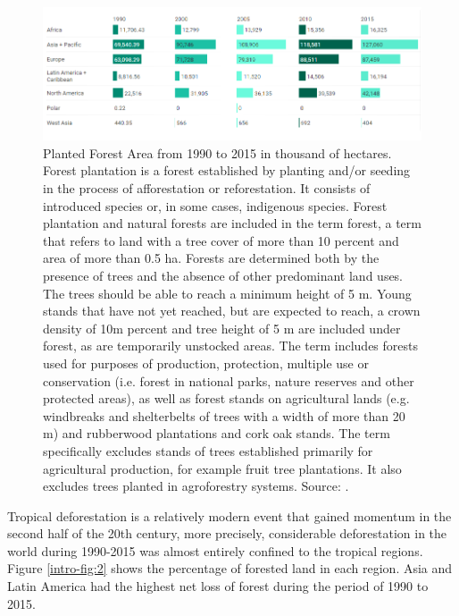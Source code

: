 \begin{figure}[H]
\centering
\includegraphics[width=1\linewidth]{Introduction/forestplantation.png}
\caption[Planted Forest Area from 1990 to 2015 in thousand of hectares]{Planted Forest Area from 1990 to 2015 in thousand of hectares. Forest plantation is a forest established by planting and/or seeding in the process of afforestation or reforestation. It consists of introduced species or, in some cases, indigenous species. Forest plantation and natural forests are included in the term forest, a term that refers to land with a tree cover of more than 10 percent and area of more than 0.5 ha. Forests are determined both by the presence of trees and the absence of other predominant land uses. The trees should be able to reach a minimum height of 5 m. Young stands that have not yet reached, but are expected to reach, a crown density of 10m percent and tree height of 5 m are included under forest, as are temporarily unstocked areas. The term includes forests used for purposes of production, protection, multiple use or conservation (i.e. forest in national parks, nature reserves and other protected areas), as well as forest stands on agricultural lands (e.g. windbreaks and shelterbelts of trees with a width of more than 20 m) and rubberwood plantations and cork oak stands. The term specifically excludes stands of trees established primarily for agricultural production, for example fruit tree plantations. It also excludes trees planted in agroforestry systems. Source: \citep{unep_2018}.}
\label{intro-fig:1}
\end{figure}

Tropical deforestation is a relatively modern event that gained momentum in the second half of the 20th century, more precisely, considerable deforestation in the world during 1990-2015 was almost entirely confined to the tropical regions. Figure \ref{intro-fig:2} shows the percentage of forested land in each region. Asia and Latin America had the highest net loss of forest during the period of 1990 to 2015. 

